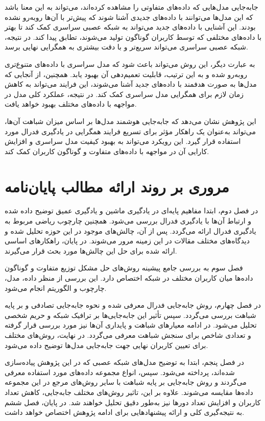 جابه‌جایی مدل‌هایی که داده‌های متفاوتی را مشاهده کرده‌اند، می‌تواند به این معنا باشد که این مدل‌ها می‌توانند با داده‌های جدیدی آشنا شوند که پیش‌تر با آن‌ها روبه‌رو نشده بودند. این آشنایی با داده‌های جدید می‌تواند به شبکه عصبی سراسری کمک کند تا بهتر با داده‌های مختلفی که توسط کاربران گوناگون تولید می‌شوند، تطابق پیدا کند. در نتیجه، شبکه عصبی سراسری می‌تواند سریع‌تر و با دقت بیشتری به همگرایی نهایی برسد.

به عبارت دیگر، این روش می‌تواند باعث شود که مدل سراسری با داده‌های متنوع‌تری روبه‌رو شده و به این ترتیب، قابلیت تعمیم‌دهی آن بهبود یابد. همچنین، از آنجایی که مدل‌ها به صورت هدفمند با داده‌های جدید آشنا می‌شوند، این فرایند می‌تواند به کاهش زمان لازم برای همگرایی مدل سراسری کمک کند. در نتیجه، عملکرد کلی مدل در مواجهه با داده‌های مختلف بهبود خواهد یافت.

این پژوهش نشان می‌دهد که جابه‌جایی هوشمند مدل‌ها بر اساس میزان شباهت آن‌ها، می‌تواند به‌عنوان یک راهکار مؤثر برای تسریع فرایند همگرایی در یادگیری فدرال مورد استفاده قرار گیرد. این رویکرد می‌تواند به بهبود کیفیت مدل سراسری و افزایش کارایی آن در مواجهه با داده‌های متفاوت و گوناگون کاربران کمک کند.



\section{مروری بر روند ارائه مطالب پایان‌نامه}

در فصل دوم، ابتدا مفاهیم پایه‌ای در یادگیری ماشین و یادگیری عمیق توضیح داده شده و ارتباط آن‌ها با یادگیری فدرال بررسی می‌شود. همچنین چارچوب ریاضی مربوط به یادگیری فدرال ارائه می‌گردد. پس از آن، چالش‌های موجود در این حوزه تحلیل شده و دیدگاه‌های مختلف مقالات در این زمینه مرور می‌شوند. در پایان، راهکارهای اساسی ارائه شده برای حل این چالش‌ها مورد بحث قرار می‌گیرند.

فصل سوم به بررسی جامع پیشینه روش‌های حل مشکل توزیع متفاوت و گوناگون داده‌ها میان کاربران مختلف در شبکه اختصاص دارد. این بررسی از منظر داده، مدل، چارچوب و الگوریتم انجام می‌شود.

در فصل چهارم، روش جابه‌جایی فدرال معرفی شده و نحوه جابه‌جایی تصادفی و بر پایه شباهت بررسی می‌گردد. سپس تأثیر این جابه‌جایی‌ها بر ترافیک شبکه و حریم شخصی تحلیل می‌شود. در ادامه معیارهای شباهت و پایداری آن‌ها نیز مورد بررسی قرار گرفته و تعدادی شاخص برای سنجش شباهت معرفی می‌گردد. در نهایت، روش‌های مختلف برای تعیین کاربران نهایی جهت جابه‌جایی مدل‌ها توضیح داده می‌شود.

در فصل پنجم، ابتدا به توضیح مدل‌های شبکه عصبی که در این پژوهش پیاده‌سازی شده‌اند، پرداخته می‌شود. سپس، انواع مجموعه داده‌های مورد استفاده معرفی می‌گردند و روش جابه‌جایی بر پایه شباهت با سایر روش‌های مرجع در این مجموعه داده‌ها مقایسه می‌شوند. علاوه بر این، تاثیر روش‌های مختلف جابه‌جایی، کاهش تعداد کاربران و افزایش تعداد دورها نیز به‌طور دقیق تحلیل خواهند شد.
در پایان، فصل ششم به نتیجه‌گیری کلی و ارائه پیشنهادهایی برای ادامه پژوهش اختصاص خواهد داشت.